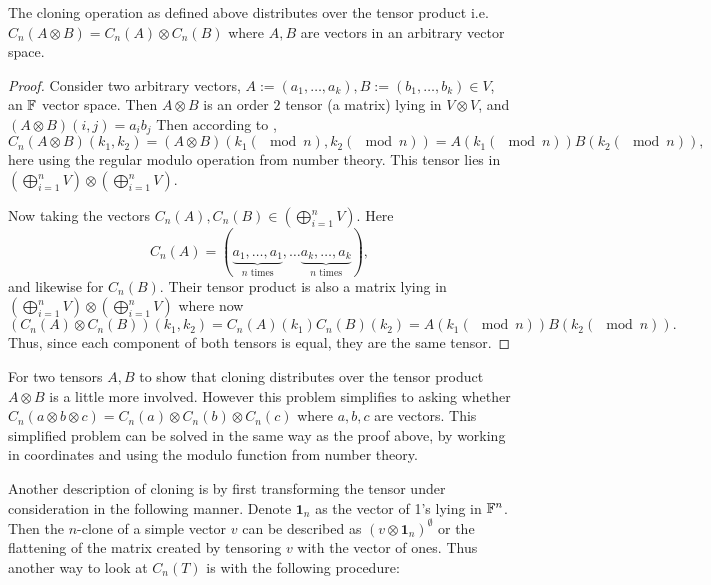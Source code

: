\documentclass[../Lael_John_MasterThesis_Draft.tex]{subfiles}
\begin{document}
\begin{lemma}\label{lemma:cloningdistribution}
    The cloning operation as defined above distributes over the tensor product i.e. $C_n(A \otimes B) = C_n(A) \otimes C_n(B)$ where $A, B$ are vectors in an arbitrary vector space.
\end{lemma}
\begin{proof}
    Consider two arbitrary vectors, $A := (a_1, \ldots, a_k), B := (b_1, \ldots, b_k) \in V$, an $\mathbb{F}$ vector space. Then $A \otimes B$ is an order $2$ tensor (a matrix) lying in $V \otimes V$, and $(A \otimes B)(i,j) = a_ib_j$
    Then according to , $$C_n(A \otimes B)(k_1,k_2) = (A \otimes B)(k_1(\mod n), k_2(\mod n)) = A(k_1(\mod n))B(k_2(\mod n)),$$ here using the regular modulo operation from number theory. This tensor lies in $\left(\bigoplus_{i=1}^n V\right) \otimes \left(\bigoplus_{i=1}^n V\right)$.

    Now taking the vectors $C_n(A), C_n(B) \in \left(\bigoplus_{i=1}^n V\right)$. Here $$C_n(A) = (\underbrace{a_1, \ldots, a_1}_{\text{$n$ times}}, \ldots \underbrace{a_k, \ldots, a_k}_{\text{$n$ times}}),$$ and likewise for $C_n(B)$. Their tensor product is also a matrix lying in $\left(\bigoplus_{i=1}^n V\right) \otimes \left(\bigoplus_{i=1}^n V\right)$ where now $$(C_n(A) \otimes C_n(B))(k_1, k_2) = C_n(A)(k_1)C_n(B)(k_2) = A(k_1(\mod n))B(k_2(\mod n)).$$Thus, since each component of both tensors is equal, they are the same tensor.
\end{proof}
\begin{remark}
    For two tensors $A, B$ to show that cloning distributes over the tensor product $A \otimes B$ is a little more involved. However this problem simplifies to asking whether $C_n(a \otimes b \otimes c) = C_n(a) \otimes C_n(b) \otimes C_n(c)$ where $a, b, c$ are vectors. This simplified problem can be solved in the same way as the proof above, by working in coordinates and using the modulo function from number theory.
\end{remark}
Another description of cloning is by first transforming the tensor under consideration in the following manner. Denote $\mathbf{1}_n$ as the vector of 1's lying in $\mathbb{F}^n$. Then the $n$-clone of a simple vector $v$ can be described as $(v \otimes \mathbf{1}_n)^{\emptyset}$ or the flattening of the matrix created by tensoring $v$ with the vector of ones. Thus another way to look at $C_n(T)$ is with the following procedure: 
\end{document}

